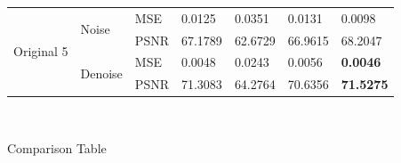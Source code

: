 \begin{center}
\begin{tabular}{llllllllllll|l|l|l|l|l|l|l|l|l|l|l|l|l|}
\multicolumn{4}{|l|}{\multirow{4}{*}{Original 5}} & \multicolumn{4}{l|}{\multirow{2}{*}{Noise}}   & \multicolumn{4}{l|}{MSE}  & \multicolumn{3}{l|}{0.0125}  & \multicolumn{3}{l|}{0.0351}  & \multicolumn{4}{l|}{0.0131}   & \multicolumn{3}{l|}{0.0098}           \\ \cline{9-25} 
\multicolumn{4}{|l|}{}                            & \multicolumn{4}{l|}{}                         & \multicolumn{4}{l|}{PSNR} & \multicolumn{3}{l|}{67.1789} & \multicolumn{3}{l|}{62.6729} & \multicolumn{4}{l|}{66.9615}  & \multicolumn{3}{l|}{68.2047}          \\ \cline{5-25} 
\multicolumn{4}{|l|}{}                            & \multicolumn{4}{l|}{\multirow{2}{*}{Denoise}} & \multicolumn{4}{l|}{MSE}  & \multicolumn{3}{l|}{0.0048}  & \multicolumn{3}{l|}{0.0243}  & \multicolumn{4}{l|}{0.0056}   & \multicolumn{3}{l|}{\textbf{0.0046}}  \\ \cline{9-25} 
\multicolumn{4}{|l|}{}                            & \multicolumn{4}{l|}{}                         & \multicolumn{4}{l|}{PSNR} & \multicolumn{3}{l|}{71.3083} & \multicolumn{3}{l|}{64.2764} & \multicolumn{4}{l|}{70.6356}  & \multicolumn{3}{l|}{\textbf{71.5275}} \\ \hline
\end{tabular}

\

Comparison Table
\end{center}










\newpage
